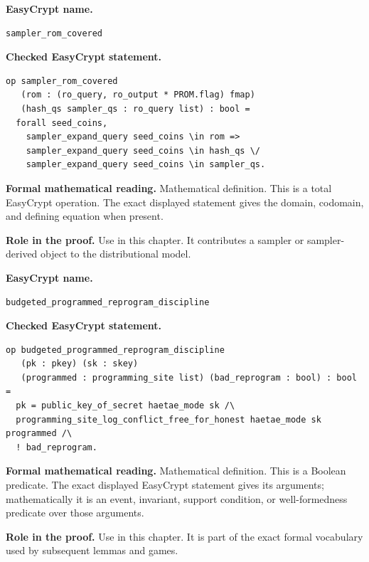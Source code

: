 \begin{formaldefinition}
\noindent\textbf{EasyCrypt name.}
\begin{lstlisting}[language=EasyCrypt,basicstyle=\ttfamily\scriptsize]
sampler_rom_covered
\end{lstlisting}
\noindent\textbf{Checked EasyCrypt statement.}
\begin{lstlisting}[language=EasyCrypt,basicstyle=\ttfamily\scriptsize]
op sampler_rom_covered
   (rom : (ro_query, ro_output * PROM.flag) fmap)
   (hash_qs sampler_qs : ro_query list) : bool =
  forall seed_coins,
    sampler_expand_query seed_coins \in rom =>
    sampler_expand_query seed_coins \in hash_qs \/
    sampler_expand_query seed_coins \in sampler_qs.
\end{lstlisting}
\noindent\textbf{Formal mathematical reading.}
Mathematical definition. This is a total EasyCrypt operation.  The exact displayed statement gives the domain, codomain, and defining equation when present.

\noindent\textbf{Role in the proof.}
Use in this chapter. It contributes a sampler or sampler-derived object to the distributional model.

\end{formaldefinition}

\begin{formaldefinition}
\noindent\textbf{EasyCrypt name.}
\begin{lstlisting}[language=EasyCrypt,basicstyle=\ttfamily\scriptsize]
budgeted_programmed_reprogram_discipline
\end{lstlisting}
\noindent\textbf{Checked EasyCrypt statement.}
\begin{lstlisting}[language=EasyCrypt,basicstyle=\ttfamily\scriptsize]
op budgeted_programmed_reprogram_discipline
   (pk : pkey) (sk : skey)
   (programmed : programming_site list) (bad_reprogram : bool) : bool =
  pk = public_key_of_secret haetae_mode sk /\
  programming_site_log_conflict_free_for_honest haetae_mode sk programmed /\
  ! bad_reprogram.
\end{lstlisting}
\noindent\textbf{Formal mathematical reading.}
Mathematical definition. This is a Boolean predicate.  The exact displayed EasyCrypt statement gives its arguments; mathematically it is an event, invariant, support condition, or well-formedness predicate over those arguments.

\noindent\textbf{Role in the proof.}
Use in this chapter. It is part of the exact formal vocabulary used by subsequent lemmas and games.

\end{formaldefinition}

